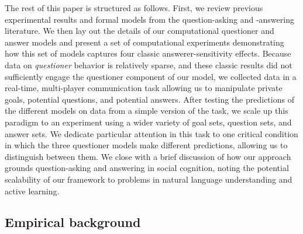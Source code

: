 \documentclass[12pt, floatsintext, jou]{apa6}
\begin{document}
The rest of this paper is structured as follows. First, we review previous experimental results and formal models from the question-asking and -answering literature. We then lay out the details of our computational questioner and answer models and present a set of computational experiments demonstrating how this set of models captures four classic answerer-sensitivity effects.
Because data on \emph{questioner} behavior is relatively sparse, and these classic results did not sufficiently engage the questioner component of our model, we collected data in a real-time, multi-player communication task allowing us to manipulate private goals, potential questions, and potential answers. After testing the predictions of the different models on data from a simple version of the task, we scale up this paradigm to an experiment using a wider variety of goal sets, question sets, and answer sets. We dedicate particular attention in this task to one critical condition in which the three questioner models make different predictions, allowing us to distinguish between them.
We close with a brief discussion of how our approach grounds question-asking and answering in social cognition, noting the potential scalability of our framework to problems in natural language understanding and active learning.

\subsection{Empirical background}
\end{document}
